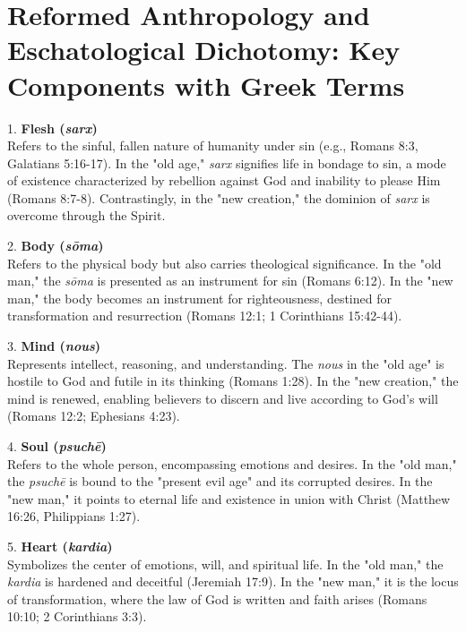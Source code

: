 \documentclass{article}
\begin{document}
\section*{Reformed Anthropology and Eschatological Dichotomy: Key Components with Greek Terms}

1. \textbf{Flesh (\textit{sarx})} \\
   \hspace*{0.5cm} Refers to the sinful, fallen nature of humanity under sin (e.g., Romans 8:3, Galatians 5:16-17). In the "old age," \textit{sarx} signifies life in bondage to sin, a mode of existence characterized by rebellion against God and inability to please Him (Romans 8:7-8). Contrastingly, in the "new creation," the dominion of \textit{sarx} is overcome through the Spirit.

2. \textbf{Body (\textit{sōma})} \\
   \hspace*{0.5cm} Refers to the physical body but also carries theological significance. In the "old man," the \textit{sōma} is presented as an instrument for sin (Romans 6:12). In the "new man," the body becomes an instrument for righteousness, destined for transformation and resurrection (Romans 12:1; 1 Corinthians 15:42-44).

3. \textbf{Mind (\textit{nous})} \\
   \hspace*{0.5cm} Represents intellect, reasoning, and understanding. The \textit{nous} in the "old age" is hostile to God and futile in its thinking (Romans 1:28). In the "new creation," the mind is renewed, enabling believers to discern and live according to God's will (Romans 12:2; Ephesians 4:23).

4. \textbf{Soul (\textit{psuchē})} \\
   \hspace*{0.5cm} Refers to the whole person, encompassing emotions and desires. In the "old man," the \textit{psuchē} is bound to the "present evil age" and its corrupted desires. In the "new man," it points to eternal life and existence in union with Christ (Matthew 16:26, Philippians 1:27).

5. \textbf{Heart (\textit{kardia})} \\
   \hspace*{0.5cm} Symbolizes the center of emotions, will, and spiritual life. In the "old man," the \textit{kardia} is hardened and deceitful (Jeremiah 17:9). In the "new man," it is the locus of transformation, where the law of God is written and faith arises (Romans 10:10; 2 Corinthians 3:3).
\end{document}
